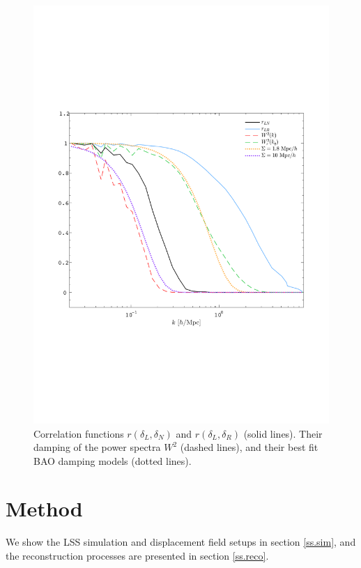 \documentclass[aps,prd,twocolumn,superscriptaddress,amsfont,amssymb,amsmath,nofootinbib,showpacs,balancelastpage]{revtex4-1}
\begin{document}
\begin{figure}[t] \centering
  \includegraphics[width=1.0\linewidth]{fig2.pdf}
  \caption{Correlation functions $r(\delta_L,\delta_N)$ and $r(\delta_L,\delta_R)$
  (solid lines). Their
  damping of the power spectra $W^2$ (dashed lines),
  and their best fit BAO damping models (dotted lines).}
  \label{fig.corr}
\end{figure}



\section{Method}\label{sec.method}
We show the LSS simulation and displacement field setups in section \ref{ss.sim},
and the reconstruction processes are presented in section \ref{ss.reco}.
\end{document}
